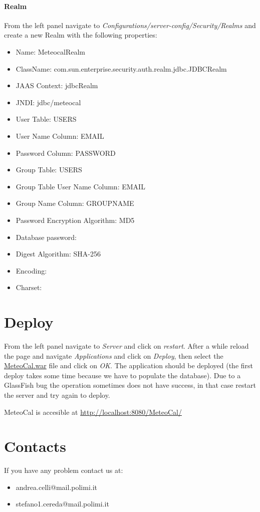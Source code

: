 \documentclass[10pt,a4paper,titlepage]{article}
\begin{document}
\subsection{Realm}
From the left panel navigate to \emph{Configurations/server-config/Security/Realms} and create a new Realm with the following properties:
\begin{itemize}
\item Name: MeteocalRealm
\item ClassName: com.sun.enterprise.security.auth.realm.jdbc.JDBCRealm
\item JAAS Context: jdbcRealm
\item JNDI: jdbc/meteocal
\item User Table: USERS
\item User Name Column: EMAIL
\item Password Column: PASSWORD
\item Group Table: USERS
\item Group Table User Name Column: EMAIL
\item Group Name Column: GROUPNAME
\item Password Encryption Algorithm: MD5
\item Database password:
\item Digest Algorithm: SHA-256
\item Encoding:
\item Charset:
\end{itemize}

\pagebreak
\part{Deploy}
From the left panel navigate to \emph{Server} and click on \emph{restart}. After a while reload the page and navigate \emph{Applications} and click on \emph{Deploy}, then select the \url{MeteoCal.war} file and click on \emph{OK}. The application should be deployed (the first deploy takes some time because we have to populate the database). Due to a GlassFish bug the operation sometimes does not have success, in that case restart the server and try again to deploy.

MeteoCal is accesible at \url{http://localhost:8080/MeteoCal/}

\pagebreak
\part{Contacts}
If you have any problem contact us at:
\begin{itemize}
\item andrea.celli@mail.polimi.it
\item stefano1.cereda@mail.polimi.it
\end{itemize}
\end{document}
